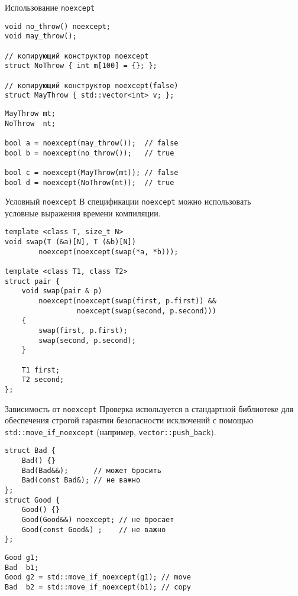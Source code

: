 \documentclass[aspectration=1610,t]{beamer}
\begin{document}
\begin{frame}[fragile]{Использование \texttt{noexcept}}
    \begin{lstlisting}
void no_throw() noexcept;
void may_throw();

// копирующий конструктор noexcept
struct NoThrow { int m[100] = {}; };

// копирующий конструктор noexcept(false)
struct MayThrow { std::vector<int> v; };
    \end{lstlisting}

\begin{lstlisting}
MayThrow mt; 
NoThrow  nt;

bool a = noexcept(may_throw());  // false
bool b = noexcept(no_throw());   // true

bool c = noexcept(MayThrow(mt)); // false
bool d = noexcept(NoThrow(nt));  // true
\end{lstlisting}
\end{frame}

\begin{frame}[fragile]{Условный \texttt{noexcept}}
    В спецификации \texttt{noexcept} можно использовать\\
    условные выражения времени компиляции.
\begin{lstlisting}
template <class T, size_t N>
void swap(T (&a)[N], T (&b)[N]) 
        noexcept(noexcept(swap(*a, *b)));

template <class T1, class T2>
struct pair {
    void swap(pair & p) 
        noexcept(noexcept(swap(first, p.first)) &&
                 noexcept(swap(second, p.second)))
    {
        swap(first, p.first);
        swap(second, p.second);
    }

    T1 first;
    T2 second;
};
\end{lstlisting}
\end{frame}


\begin{frame}[fragile]{Зависимость от \texttt{noexcept}}
    Проверка  используется в стандартной 
    библиотеке для обеспечения строгой гарантии безопасности исключений с помощью
    \texttt{std::move\_if\_noexcept} (например, \texttt{vector::push\_back}).

\begin{lstlisting}
struct Bad {
    Bad() {}
    Bad(Bad&&);      // может бросить
    Bad(const Bad&); // не важно
};
struct Good {
    Good() {}
    Good(Good&&) noexcept; // не бросает
    Good(const Good&) ;    // не важно
};
\end{lstlisting}
\begin{lstlisting}
Good g1;
Bad  b1;
Good g2 = std::move_if_noexcept(g1); // move
Bad  b2 = std::move_if_noexcept(b1); // copy
\end{lstlisting}
    
\end{frame}
\end{document}
